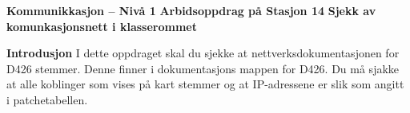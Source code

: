 

\noindent

\vskip 5pt

\vskip 5pt
\begin{center}
\textbf{Kommunikkasjon -- Nivå 1 }
\vskip 5pt 
\textbf{Arbidsoppdrag på Stasjon 14}
\vskip 5pt 
\textbf{Sjekk av komunkasjonsnett i klasserommet}
\end{center}

\textbf{Introdusjon}
 I dette oppdraget skal du sjekke at nettverksdokumentasjonen for D426 stemmer. Denne finner i dokumentasjons mappen for D426. 
Du  må sjakke at alle koblinger som vises på kart stemmer og at IP-adressene er slik som  angitt i patchetabellen. 

